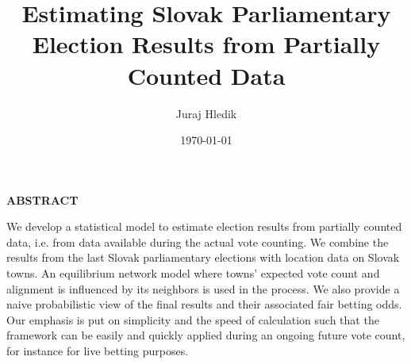 \documentclass[12pt]{article}
\begin{document}
	\onehalfspacing      %
	
	\author{Juraj Hledik} 
	
	\title{\Large \textbf{Estimating Slovak Parliamentary Election Results from Partially Counted Data}}
	
	\date{\today} 
	
	
	\maketitle
	\thispagestyle{empty}
	\bigskip
	
	\centerline{\bf ABSTRACT}
	\begin{onehalfspace}%
		We develop a statistical model to estimate election results from partially counted data, i.e. from data available during the actual vote counting. We combine the results from the last Slovak parliamentary elections with location data on Slovak towns. An equilibrium network model where towns' expected vote count and alignment is influenced by its neighbors is used in the process. We also provide a naive probabilistic view of the final results and their associated fair betting odds. Our emphasis is put on simplicity and the speed of calculation such that the framework can be easily and quickly applied during an ongoing future vote count, for instance for live betting purposes.
	\end{onehalfspace}
	\medskip	
\end{document}
